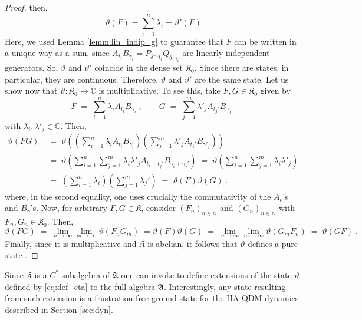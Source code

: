 \documentclass[a4paper,12pt,twoside,reqno]{amsart}
\theoremstyle{plain}
\theoremstyle{definition}
\theoremstyle{remark}
\numberwithin{equation}{section}
\numberwithin{figure}{section}
\numberwithin{table}{section}
\newcommand{\CC}{\mathbb{C}}
\newcommand{\NN}{\mathbb{N}}
\newcommand{\pa}[1]{\left( #1 \right)}
\newcommand{\n}[1]{\mathbb{#1}}
\begin{document}
\begin{proof}
		then,
		\begin{equation*}
			\vartheta(F)=\sum_{i=1}^n\lambda_i=\vartheta'(F)
		\end{equation*}
		Here, we used Lemma \ref{lemm:lin_indip_g} to guarantee that $F$ can be written in a unique way as a sum, since $A_{t_i}B_{\gamma_i}=P_{\delta^{-1}t_i}Q_{\delta_1\gamma_i}$ are linearly independent generators.
		So, $\vartheta$ and $\vartheta'$ coincide in the dense set $\mathfrak{K}_0$. Since there are states, in particular, they are continuous. Therefore, $\vartheta$ and $\vartheta'$ are the same state. 
		Let us show now that $\vartheta:\mathfrak{K}_0\to\CC$ is multiplicative. To see this, take $F,G\in \mathfrak{K}_0$ given by
		$$F\;=\;\sum_{i=1}^n \lambda_i A_{t_i}B_{\gamma_i}\;,\qquad G\;=\;\sum_{j=1}^m \lambda'_j A_{t_j'}B_{{\gamma_j'}}\;$$
		with $\lambda_i,\lambda'_j\in\n{C}$.
		Then,
		\begin{align*}
			\vartheta(FG)\;&=\;\vartheta\pa{\pa{\sum_{i=1}^n \lambda_i A_{t_i}B_{\gamma_i}}\pa{\sum_{j=1}^m \lambda'_j A_{{t_j'}}B_{{\gamma'_j}}}}\\
			&=\;\vartheta\pa{\sum_{i=1}^n\sum_{j=1}^m \lambda_i\lambda'_j A_{t_i+{t_j'}}B_{\gamma_i+{\gamma_j'}}}\;=\;
			\vartheta\pa{\sum_{i=1}^n\sum_{j=1}^m \lambda_i\lambda'_j }\\
			&=\;\pa{\sum_{i=1}^n \lambda_i}\pa{\sum_{j=1}^m \lambda_j'}\;=\;\vartheta(F)\vartheta(G)\;.
		\end{align*}
		where, in the second equality, one uses crucially the commutativity of the $A_t$'s and $B_\gamma$'s.
		Now, for arbitrary $F,G\in\mathfrak{K}$, consider $(F_n)_{n\in\NN}$ and $(G_n)_{n\in\NN}$ with $F_n,G_n\in\mathfrak{K}_0$. Then,
		$$\vartheta(FG)\;=\;\lim_{n\to\infty}\lim_{m\to\infty} \vartheta(F_nG_m)\;=\vartheta(F)\vartheta(G)\;=\;\lim_{n\to\infty}\lim_{m\to\infty} \vartheta(G_mF_n)\;=\;\vartheta(GF)\;.$$
		Finally, since it is multiplicative and $\mathfrak{K}$ is abelian, it follows that $\vartheta$ defines a pure state \cite[Corollary 2.3.21]{Bratelli}.
	\end{proof}
	
	
	
	
	
	
	\medskip
	
	
	
	
	
	
	
	
	Since $\mathfrak{K}$ is a $C^*$-subalgebra of $\mathfrak{A}$ one can invoke
	\cite[Proposition 2.3.24]{Bratelli} to define extensions of the state $\vartheta$ defined by \eqref{eq:def_eta} to the full algebra $\mathfrak{A}$. Interestingly, 
	any state resulting from such extension is a frustration-free ground state for the {HA-QDM dynamics} described in Section \ref{sec:dyn}.
	
\end{document}
